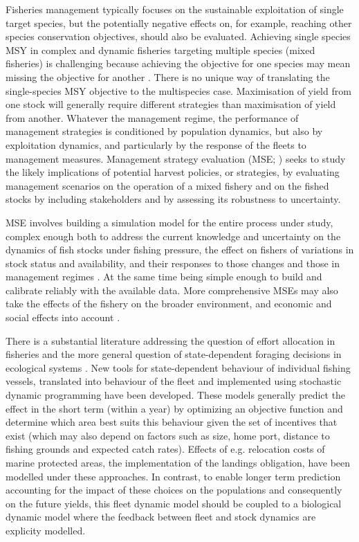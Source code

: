\documentclass[12pt,oneline,a4paper,numbib]{ouparticle}
\numberwithin{equation}{subsection} %
\begin{document}
Fisheries management typically focuses on the sustainable exploitation of single target species, but the potentially negative effects on, for example, reaching other species conservation objectives, should also be evaluated. Achieving single species MSY in complex and dynamic fisheries targeting multiple species (mixed fisheries) is challenging because achieving the objective for one species may mean missing the objective for another \cite{Ulrich2017}. There is no unique way of translating the single-species MSY objective to the multispecies case. Maximisation of yield from one stock will generally require different strategies than maximisation of yield from another.  Whatever the management regime, the performance of management strategies is conditioned by population dynamics, but also by exploitation dynamics, and particularly by the response of the fleets to management measures. Management strategy evaluation (MSE; \cite{Sainsbury2000, Smith1994, Venables2009}) seeks to study the likely implications of potential harvest policies, or strategies, by evaluating management scenarios on the operation of a mixed fishery and on the fished stocks by including stakeholders and by assessing its robustness to uncertainty. 

MSE involves building a simulation model for the entire process under study, complex enough both to address the current knowledge and uncertainty on the dynamics of fish stocks under fishing pressure, the effect on fishers of variations in stock status and availability, and their responses to those changes and those in management regimes \cite{Venables2009}. At the same time being simple enough to build and calibrate reliably with the available data. More comprehensive MSEs may also take the effects of the fishery on the broader environment, and economic and social effects into account \cite{Dichmont2008, Fulton2007}. 

There is a substantial literature addressing the question of effort allocation in fisheries and the more general question of state-dependent foraging decisions in ecological systems \cite{ClarkandMangel2000,Houston1999}. New tools for state-dependent behaviour of individual fishing vessels, translated into behaviour of the fleet and implemented using stochastic dynamic programming \cite{Alzorriz2018,Batsleer2015, Dowling2011, Poos2010} have been developed. These models generally predict the effect in the short term (within a year) by optimizing an objective function and determine which area best suits this behaviour given the set of incentives that exist (which may also depend on factors such as size, home port, distance to fishing grounds and expected catch rates). Effects of e.g. relocation costs of marine protected areas, the implementation of the landings obligation, have been modelled under these approaches. In contrast, to enable longer term prediction accounting for the impact of these choices on the populations and consequently on the future yields, this fleet dynamic model should be coupled to a biological dynamic model where the feedback between fleet and stock dynamics are explicity modelled.
 
\end{document}
